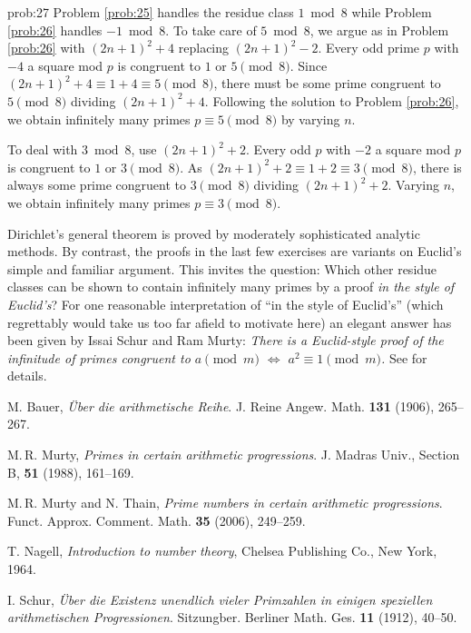 \begin{sol}{prob:27} Problem \ref{prob:25} handles the residue class $1\bmod{8}$ while Problem \ref{prob:26} handles $-1\bmod{8}$. To take care of $5\bmod{8}$, we argue as in Problem \ref{prob:26} with $(2n+1)^2+4$ replacing $(2n+1)^2-2$. Every odd prime $p$ with $-4$ a square mod $p$ is congruent to $1$ or $5 \pmod{8}$. Since $(2n+1)^2+4\equiv 1+4\equiv 5\pmod{8}$, there must be some prime congruent to $5\pmod{8}$ dividing $(2n+1)^2+4$. Following the solution to Problem \ref{prob:26}, we obtain infinitely many primes $p\equiv 5\pmod{8}$ by varying $n$.

To deal with $3\bmod{8}$, use $(2n+1)^2+2$. Every odd $p$ with $-2$ a square mod $p$ is congruent to $1$ or $3\pmod{8}$. As $(2n+1)^2+2\equiv 1+2\equiv 3\pmod{8}$, there is always some prime congruent to $3\pmod{8}$ dividing $(2n+1)^2+2$. Varying $n$, we obtain infinitely many primes $p\equiv 3\pmod{8}$. 


\begin{rmk} Dirichlet's general theorem is proved by moderately sophisticated analytic methods. By contrast, the proofs in the last few exercises are variants on Euclid's simple and familiar argument. This invites the question: Which other residue classes can be shown to contain infinitely many primes by a proof \emph{in the style of Euclid's}? For one reasonable interpretation of ``in the style of Euclid's'' (which regrettably would take us too far afield to motivate here) an elegant answer has been given by Issai Schur and Ram Murty: \emph{There is a Euclid-style proof of the infinitude of primes congruent to $a\pmod{m}$ $\Longleftrightarrow$ $a^2\equiv 1\pmod{m}$.} See \cite{murty, MT, schur} for details.
\end{rmk}
\end{sol}


\renewcommand\refname{\normalsize References}
\let\oldaddcontentsline\addcontentsline
\renewcommand{\addcontentsline}[3]{}
\begin{thebibliography}{11}
 M. Bauer, \emph{\"{U}ber die arithmetische Reihe}. J. Reine Angew. Math. \textbf{131} (1906), 265--267.

 M.\,R. Murty, \emph{Primes in certain arithmetic progressions}. J. Madras Univ., Section B, \textbf{51} (1988), 161--169.

 M.\,R. Murty and N. Thain, \emph{Prime numbers in certain arithmetic progressions}. Funct. Approx. Comment. Math. \textbf{35} (2006), 249--259.

 T. Nagell, \emph{Introduction to number theory},
Chelsea Publishing Co., New York, 1964.

 I. Schur, \emph{\"{U}ber die {E}xistenz unendlich vieler {P}rimzahlen in einigen speziellen arithmetischen {P}rogressionen}. Sitzungber. Berliner Math. Ges. \textbf{11} (1912), 40--50.
\end{thebibliography}
\let\addcontentsline\oldaddcontentsline




